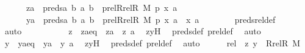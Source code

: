 \begin{isabellebody}
\ \ \ \ \ \ {\isachardoublequoteopen}za\ {\isasymin}\ preds{\isacharparenleft}{\kern0pt}{\isasymlambda}a\ b{\isachardot}{\kern0pt}\ {\isasymlangle}a{\isacharcomma}{\kern0pt}\ b{\isasymrangle}\ {\isasymin}\ prel{\isacharparenleft}{\kern0pt}Rrel{\isacharparenleft}{\kern0pt}R{\isacharcomma}{\kern0pt}\ M{\isacharparenright}{\kern0pt}{\isacharcomma}{\kern0pt}\ p{\isacharparenright}{\kern0pt}{\isacharcomma}{\kern0pt}\ {\isasymlangle}x{\isacharcomma}{\kern0pt}\ a{\isasymrangle}{\isacharparenright}{\kern0pt}{\isachardoublequoteclose}\isanewline
\ \ \ \ \ \ {\isachardoublequoteopen}ya\ {\isasymin}\ preds{\isacharparenleft}{\kern0pt}{\isasymlambda}a\ b{\isachardot}{\kern0pt}\ {\isasymlangle}a{\isacharcomma}{\kern0pt}\ b{\isasymrangle}\ {\isasymin}\ prel{\isacharparenleft}{\kern0pt}Rrel{\isacharparenleft}{\kern0pt}R{\isacharcomma}{\kern0pt}\ M{\isacharparenright}{\kern0pt}{\isacharcomma}{\kern0pt}\ p{\isacharparenright}{\kern0pt}{\isacharcomma}{\kern0pt}\ {\isasymlangle}x{\isacharcomma}{\kern0pt}\ a{\isasymrangle}{\isacharparenright}{\kern0pt}\ {\isasymunion}\ {\isacharbraceleft}{\kern0pt}{\isasymlangle}x{\isacharcomma}{\kern0pt}\ a{\isasymrangle}{\isacharbraceright}{\kern0pt}{\isachardoublequoteclose}\isanewline
\ \ \ \ \ \ \isamarkupfalse%
\ preds{\isacharunderscore}{\kern0pt}rel{\isacharunderscore}{\kern0pt}def\ \isanewline
\ \ \ \ \ \ \isamarkupfalse%
\ auto\isanewline
\ \ \ \ \isanewline
\ \ \ \ \isamarkupfalse%
\ z\ \ zaeq\ {\isacharcolon}{\kern0pt}\ {\isachardoublequoteopen}za\ {\isacharequal}{\kern0pt}\ {\isacharless}{\kern0pt}z{\isacharcomma}{\kern0pt}\ a{\isachargreater}{\kern0pt}{\isachardoublequoteclose}\ \isamarkupfalse%
\ zyH\ \isamarkupfalse%
\ preds{\isacharunderscore}{\kern0pt}def\ prel{\isacharunderscore}{\kern0pt}def\ \isamarkupfalse%
\ auto\isanewline
\ \ \ \ \isamarkupfalse%
\ y\ \ yaeq\ {\isacharcolon}{\kern0pt}\ {\isachardoublequoteopen}ya\ {\isacharequal}{\kern0pt}\ {\isacharless}{\kern0pt}y{\isacharcomma}{\kern0pt}\ a{\isachargreater}{\kern0pt}{\isachardoublequoteclose}\ \isamarkupfalse%
\ zyH\ \isamarkupfalse%
\ preds{\isacharunderscore}{\kern0pt}def\ prel{\isacharunderscore}{\kern0pt}def\ \isamarkupfalse%
\ auto\isanewline
\isanewline
\ \ \ \ \isamarkupfalse%
\ rel\ {\isacharcolon}{\kern0pt}\ {\isachardoublequoteopen}{\isacharless}{\kern0pt}z{\isacharcomma}{\kern0pt}\ y{\isachargreater}{\kern0pt}\ {\isasymin}\ Rrel{\isacharparenleft}{\kern0pt}R{\isacharcomma}{\kern0pt}\ M{\isacharparenright}{\kern0pt}{\isachardoublequoteclose}\ \isamarkupfalse%

\end{isabellebody}
